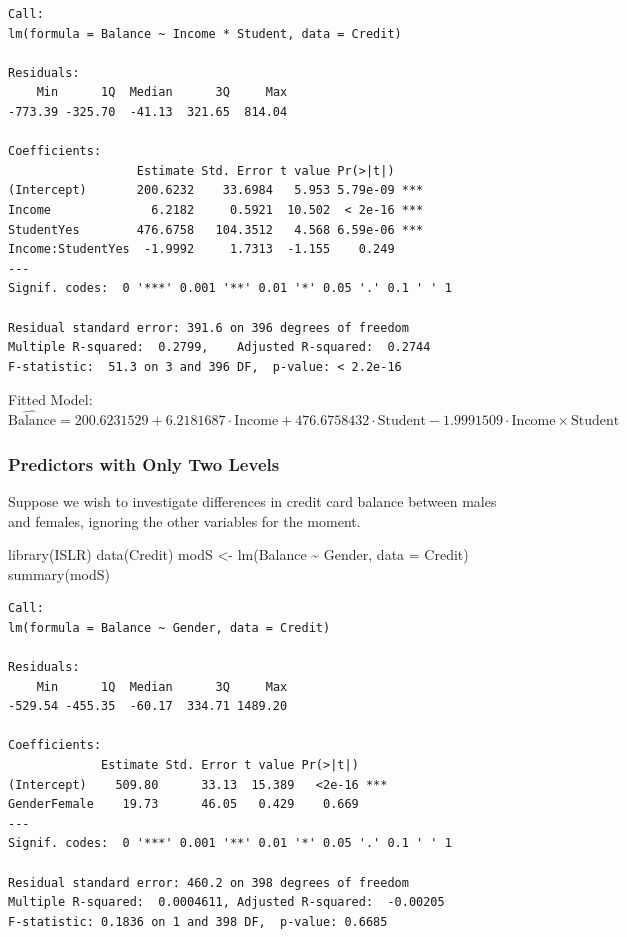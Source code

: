 \documentclass[
]{article}
\newenvironment{Shaded}{\begin{snugshade}}{\end{snugshade}}
\newcommand{\AttributeTok}[1]{\textcolor[rgb]{0.77,0.63,0.00}{#1}}
\newcommand{\FunctionTok}[1]{\textcolor[rgb]{0.00,0.00,0.00}{#1}}
\newcommand{\NormalTok}[1]{#1}
\newcommand{\OtherTok}[1]{\textcolor[rgb]{0.56,0.35,0.01}{#1}}
\newcommand{\SpecialCharTok}[1]{\textcolor[rgb]{0.00,0.00,0.00}{#1}}
\begin{document}
\begin{verbatim}
Call:
lm(formula = Balance ~ Income * Student, data = Credit)

Residuals:
    Min      1Q  Median      3Q     Max 
-773.39 -325.70  -41.13  321.65  814.04 

Coefficients:
                  Estimate Std. Error t value Pr(>|t|)    
(Intercept)       200.6232    33.6984   5.953 5.79e-09 ***
Income              6.2182     0.5921  10.502  < 2e-16 ***
StudentYes        476.6758   104.3512   4.568 6.59e-06 ***
Income:StudentYes  -1.9992     1.7313  -1.155    0.249    
---
Signif. codes:  0 '***' 0.001 '**' 0.01 '*' 0.05 '.' 0.1 ' ' 1

Residual standard error: 391.6 on 396 degrees of freedom
Multiple R-squared:  0.2799,    Adjusted R-squared:  0.2744 
F-statistic:  51.3 on 3 and 396 DF,  p-value: < 2.2e-16
\end{verbatim}

Fitted Model: \(\widehat{\text{Balance}} = 200.6231529 + 6.2181687\cdot \text{Income} + 476.6758432\cdot \text{Student} -1.9991509\cdot\text{Income}\times\text{Student}\)

\hypertarget{predictors-with-only-two-levels}{%
\subsubsection{Predictors with Only Two Levels}\label{predictors-with-only-two-levels}}

Suppose we wish to investigate differences in credit card balance between males and females, ignoring the other variables for the moment.

\begin{Shaded}
\begin{Highlighting}[]
\FunctionTok{library}\NormalTok{(ISLR)}
\FunctionTok{data}\NormalTok{(Credit)}
\NormalTok{modS }\OtherTok{\textless{}{-}} \FunctionTok{lm}\NormalTok{(Balance }\SpecialCharTok{\textasciitilde{}}\NormalTok{ Gender, }\AttributeTok{data =}\NormalTok{ Credit)}
\FunctionTok{summary}\NormalTok{(modS)}
\end{Highlighting}
\end{Shaded}

\begin{verbatim}
Call:
lm(formula = Balance ~ Gender, data = Credit)

Residuals:
    Min      1Q  Median      3Q     Max 
-529.54 -455.35  -60.17  334.71 1489.20 

Coefficients:
             Estimate Std. Error t value Pr(>|t|)    
(Intercept)    509.80      33.13  15.389   <2e-16 ***
GenderFemale    19.73      46.05   0.429    0.669    
---
Signif. codes:  0 '***' 0.001 '**' 0.01 '*' 0.05 '.' 0.1 ' ' 1

Residual standard error: 460.2 on 398 degrees of freedom
Multiple R-squared:  0.0004611, Adjusted R-squared:  -0.00205 
F-statistic: 0.1836 on 1 and 398 DF,  p-value: 0.6685
\end{verbatim}
\end{document}
